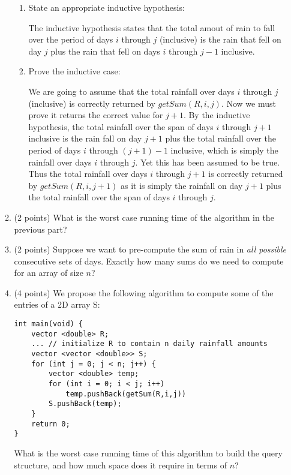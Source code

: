 \documentclass[11pt]{article}
\newcommand{\fillinlarge}[1]{\fbox{\LARGE{\textbf{#1}}}}
\newcommand{\fillinsmall}[1]{\fbox{\text{#1}}}
\begin{document}
\begin{enumerate}
\begin{enumerate}
\begin{enumerate}
    \item State an appropriate inductive hypothesis:
\begin{framed}
The inductive hypothesis states that the total amout of rain to fall over the period of days $i$ through $j$ (inclusive) is the rain that fell on day $j$ plus the rain that fell on days $i$ through $j-1$ inclusive.
\end{framed}
    
    \item Prove the inductive case:\\
    
\begin{framed}
We are going to assume that the total rainfall over days $i$ through $j$ (inclusive) is correctly returned by $getSum(R, i, j)$. Now we must prove it returns the correct value for $j+1$. By the inductive hypothesis, the total rainfall over the span of days $i$ through $j + 1$ inclusive is the rain fall on day $j+1$ plus the total rainfall over the period of days $i$ through $(j+1) - 1$ inclusive, which is simply the rainfall over days $i$ through $j$. Yet this has been assumed to be true. Thus the total rainfall over days $i$ through $j+1$ is correctly returned by $getSum(R, i, j+1)$ as it is simply the rainfall on day $j+1$ plus the total rainfall over the span of days $i$ through $j$.
\end{framed}
    
\end{enumerate}
\item (2 points) What is the worst case running time of the algorithm in the previous part?

\fillinlarge{O(n)}

\newpage
\item (2 points) Suppose we want to pre-compute the sum of rain in {\em all possible} consecutive sets of days. Exactly how many sums do we need to compute for an array of size $n$?
\fillinsmall{$n(n+1)/2$}

\item (4 points) We propose the following algorithm to compute some of the entries of a 2D array S:
\begin{lstlisting}
int main(void) {
    vector <double> R; 
    ... // initialize R to contain n daily rainfall amounts
    vector <vector <double>> S;
    for (int j = 0; j < n; j++) {
        vector <double> temp;
        for (int i = 0; i < j; i++)
            temp.pushBack(getSum(R,i,j))
        S.pushBack(temp);
    }
    return 0;
}
\end{lstlisting}
What is the worst case running time of this algorithm to build the query structure, and how much space does it require in terms of $n$?




\end{enumerate}
\end{enumerate}
\end{document}
